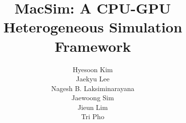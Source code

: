 \documentclass[11pt, letterpaper]{article}
\begin{document}
\title{MacSim: A CPU-GPU Heterogeneous Simulation Framework}

\author{Hyesoon Kim\\
Jaekyu Lee\\
Nagesh B. Laksiminarayana\\
Jaewoong Sim\\
Jieun Lim\\
Tri Pho}

\maketitle
\thispagestyle{empty}

\clearpage

\tableofcontents

\clearpage








%



%
%

\clearpage




\end{document}
